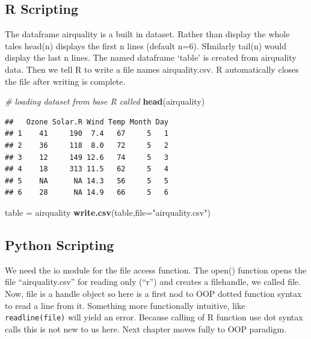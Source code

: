 \documentclass[]{book}
\newenvironment{Shaded}{\begin{snugshade}}{\end{snugshade}}
\newcommand{\KeywordTok}[1]{\textcolor[rgb]{0.13,0.29,0.53}{\textbf{#1}}}
\newcommand{\DataTypeTok}[1]{\textcolor[rgb]{0.13,0.29,0.53}{#1}}
\newcommand{\StringTok}[1]{\textcolor[rgb]{0.31,0.60,0.02}{#1}}
\newcommand{\CommentTok}[1]{\textcolor[rgb]{0.56,0.35,0.01}{\textit{#1}}}
\newcommand{\NormalTok}[1]{#1}
\theoremstyle{definition}
\theoremstyle{definition}
\theoremstyle{definition}
\theoremstyle{remark}
\begin{document}
\subsection{R Scripting}\label{r-scripting-3}

The dataframe airquality is a built in dataset. Rather than display the
whole tales head(n) displays the first n lines (default n=6). SImilarly
tail(n) would display the last n lines. The named dataframe `table' is
created from airquality data. Then we tell R to write a file names
airquality.csv. R automatically closes the file after writing is
complete.

\begin{Shaded}
\begin{Highlighting}[]
\CommentTok{# loading dataset from base R called }
\KeywordTok{head}\NormalTok{(airquality)}
\end{Highlighting}
\end{Shaded}

\begin{verbatim}
##   Ozone Solar.R Wind Temp Month Day
## 1    41     190  7.4   67     5   1
## 2    36     118  8.0   72     5   2
## 3    12     149 12.6   74     5   3
## 4    18     313 11.5   62     5   4
## 5    NA      NA 14.3   56     5   5
## 6    28      NA 14.9   66     5   6
\end{verbatim}

\begin{Shaded}
\begin{Highlighting}[]
\NormalTok{table =}\StringTok{ }\NormalTok{airquality}
\KeywordTok{write.csv}\NormalTok{(table,}\DataTypeTok{file=}\StringTok{"airquality.csv"}\NormalTok{)}
\end{Highlighting}
\end{Shaded}

\subsection{Python Scripting}\label{python-scripting-3}

We need the io module for the file access function. The open() function
opens the file ``airquality.csv'' for reading only (``r'') and creates a
filehandle, we called file. Now, file is a handle object so here is a
first nod to OOP dotted function syntax to read a line from it.
Something more functionally intuitive, like \texttt{readline(file)} will
yield an error. Because calling of R function use dot syntax calls this
is not new to us here. Next chapter moves fully to OOP paradigm.
\end{document}
